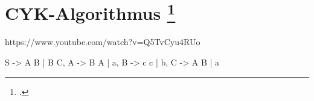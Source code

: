 \documentclass{lehramt-informatik-aufgabe}
\begin{document}
\section{CYK-Algorithmus
\footcite{}}

https://www.youtube.com/watch?v=Q5TvCyu4RUo

\begin{liProduktionsRegeln}
S -> A B | B C,
A -> B A | a,
B -> c c | b,
C -> A B | a
\end{liProduktionsRegeln}
\end{document}
